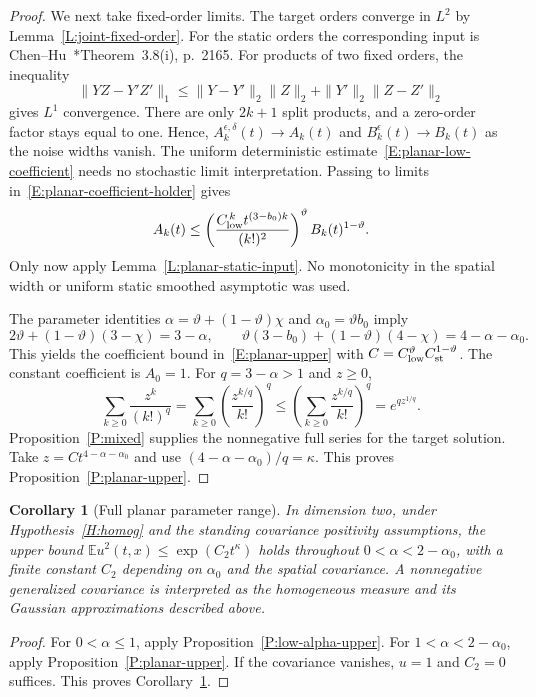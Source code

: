 \documentclass[12pt]{article}
\numberwithin{equation}{section}
\newtheorem{corollary}[theorem]{Corollary}
\theoremstyle{definition}
\newcommand{\E}{\mathbb{E}}
\begin{document}
\begin{proof}
  We next take fixed-order limits. The target orders converge in $L^2$
  by Lemma~\ref{L:joint-fixed-order}.
  For the static orders the corresponding input is
  Chen--Hu~\cite{chen.hu:25:hyperbolic}*{Theorem~3.8(i), p.~2165}.
  For products of two fixed orders, the inequality
  \[
    \|YZ-Y'Z'\|_1
    \le\|Y-Y'\|_2\|Z\|_2+\|Y'\|_2\|Z-Z'\|_2
  \]
  gives $L^1$ convergence. There are only $2k+1$ split products, and
  a zero-order factor stays equal to one. Hence,
  $A_k^{\epsilon,\delta}(t)\to A_k(t)$ and
  $B_k^\epsilon(t)\to B_k(t)$ as the noise widths vanish. The uniform
  deterministic estimate~\eqref{E:planar-low-coefficient} needs no
  stochastic limit interpretation. Passing to limits
  in~\eqref{E:planar-coefficient-holder} gives
  \[
    A_k(t)\le
    \left(\frac{C_{\rm low}^{\,k}t^{(3-b_0)k}}{(k!)^2}\right)^\vartheta
    B_k(t)^{1-\vartheta}.
  \]
  Only now apply Lemma~\ref{L:planar-static-input}. No monotonicity
  in the spatial width or uniform static smoothed asymptotic was used.

  The parameter identities
  $\alpha=\vartheta+(1-\vartheta)\chi$ and
  $\alpha_0=\vartheta b_0$ imply
  \[
    2\vartheta+(1-\vartheta)(3-\chi)=3-\alpha,\qquad
    \vartheta(3-b_0)+(1-\vartheta)(4-\chi)=4-\alpha-\alpha_0.
  \]
  This yields the coefficient bound in~\eqref{E:planar-upper} with
  $C=C_{\rm low}^\vartheta C_{\rm st}^{1-\vartheta}$.
  The constant coefficient is $A_0=1$. For $q=3-\alpha>1$ and $z\ge0$,
  \[
    \sum_{k\ge0}\frac{z^k}{(k!)^q}
    =\sum_{k\ge0}\left(\frac{z^{k/q}}{k!}\right)^q
    \le\left(\sum_{k\ge0}\frac{z^{k/q}}{k!}\right)^q
    =e^{qz^{1/q}}.
  \]
  Proposition~\ref{P:mixed} supplies the nonnegative full series for
  the target solution. Take $z=Ct^{4-\alpha-\alpha_0}$ and use
  $(4-\alpha-\alpha_0)/q=\kappa$. This proves
  Proposition~\ref{P:planar-upper}.
\end{proof}

\begin{corollary}[Full planar parameter range]\label{C:planar-range}
  In dimension two, under Hypothesis~\ref{H:homog} and the standing
  covariance positivity assumptions, the upper bound
  $\E u^2(t,x)\le\exp(C_2t^\kappa)$ holds throughout
  $0<\alpha<2-\alpha_0$, with a finite constant $C_2$ depending on
  $\alpha_0$ and the spatial covariance.
  A nonnegative generalized covariance is interpreted as the homogeneous
  measure and its Gaussian approximations described above.
\end{corollary}

\begin{proof}
  For $0<\alpha\le1$, apply Proposition~\ref{P:low-alpha-upper}.
  For $1<\alpha<2-\alpha_0$, apply Proposition~\ref{P:planar-upper}.
  If the covariance vanishes, $u=1$ and $C_2=0$ suffices. This proves
  Corollary~\ref{C:planar-range}.
\end{proof}
\end{document}
